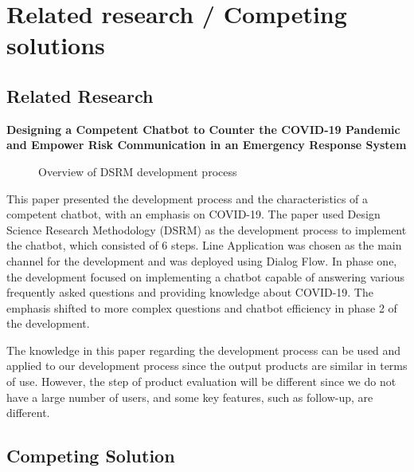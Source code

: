 \documentclass[12pt,oneside,openright,a4paper]{cpe-english-project}
\begin{document}
  \section{Related research / Competing solutions}
    \subsection{Related Research}
      \qquad \textbf{Designing a Competent Chatbot to Counter the COVID-19 Pandemic and Empower Risk Communication in an Emergency Response System}\par
      \begin{figure}[!h]
        \centering
        \caption{Overview of DSRM development process\cite{relatedwork1}}\label{fig:Research_1}
      \end{figure}
      \qquad This paper presented the development process and the characteristics of a competent chatbot, with an emphasis on COVID-19. The paper used Design Science Research Methodology (DSRM) as the development process to implement the chatbot, which consisted of 6 steps. Line Application was chosen as the main channel for the development and was deployed using Dialog Flow. In phase one, the development focused on implementing a chatbot capable of answering various frequently asked questions and providing knowledge about COVID-19. The emphasis shifted to more complex questions and chatbot efficiency in phase 2 of the development.\par
      \qquad The knowledge in this paper regarding the development process can be used and applied to our development process since the output products are similar in terms of use. However, the step of product evaluation will be different since we do not have a large number of users, and some key features, such as follow-up, are different.\par
    \subsection{Competing Solution}
\end{document}
